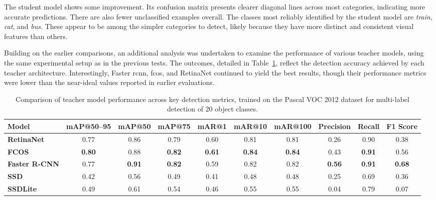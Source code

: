 The student model shows some improvement. Its confusion matrix presents clearer diagonal lines across most categories, indicating more accurate predictions. There are also fewer unclassified examples overall. The classes most reliably identified by the student model are \textit{train}, \textit{cat}, and \textit{bus}. These appear to be among the simpler categories to detect, likely because they have more distinct and consistent visual features than others.

Building on the earlier comparisons, an additional analysis was undertaken to examine the performance of various teacher models, using the same experimental setup as in the previous tests. The outcomes, detailed in Table~\ref{tab:teacher_model_metrics_pascal_voc}, reflect the detection accuracy achieved by each teacher architecture. Interestingly, Faster \gls{rcnn}, \gls{fcos}, and RetinaNet continued to yield the best results, though their performance metrics were lower than the near-ideal values reported in earlier evaluations.

\begin{table}[!htbp]
    \centering
    \begin{adjustbox}{max width=\textwidth}
    \renewcommand{\arraystretch}{1.5}
    \begin{tabular}{|l|c|c|c|c|c|c|c|c|c|}
        \hline
        \textbf{Model} & \textbf{mAP@50--95} & \textbf{mAP@50} & \textbf{mAP@75} & \textbf{mAR@1} & \textbf{mAR@10} & \textbf{mAR@100} & \textbf{Precision} & \textbf{Recall} & \textbf{F1 Score} \\ \hline \hline
        \textbf{RetinaNet} & 0.77 & 0.86 & 0.79 & 0.60 & 0.81 & 0.81 & 0.26 & 0.90 & 0.38 \\\hline
        \textbf{FCOS} & \textbf{0.80} & 0.88 & \textbf{0.82} & \textbf{0.61} & \textbf{0.84} & \textbf{0.84} & 0.43 & \textbf{0.91} & 0.56 \\\hline
        \textbf{Faster R-CNN} & 0.77 & \textbf{0.91} & \textbf{0.82} & 0.59 & 0.82 & 0.82 & \textbf{0.56} & \textbf{0.91} & \textbf{0.68} \\\hline
        \textbf{SSD} & 0.42 & 0.56 & 0.49 & 0.41 & 0.48 & 0.48 & 0.25 & 0.69 & 0.36 \\\hline
        \textbf{SSDLite} & 0.49 & 0.61 & 0.54 & 0.46 & 0.55 & 0.55 & 0.04 & 0.79 & 0.07 \\
        \hline
    \end{tabular}
    \renewcommand{\arraystretch}{1}
    \end{adjustbox}
    \caption{Comparison of teacher model performance across key detection metrics, trained on the Pascal VOC 2012 dataset for multi-label detection of 20 object classes.}
    \label{tab:teacher_model_metrics_pascal_voc}
\end{table}

